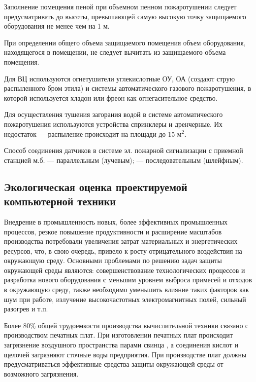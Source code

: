 Заполнение помещения пеной при объемном пенном пожаротушении следует предусматривать до высоты, превышающей самую высокую
точку защищаемого оборудования не менее чем на 1 м.

При определении общего объема защищаемого помещения объем оборудования, находящегося в помещении, не следует вычитать
из защищаемого объема помещения.


Для ВЦ используются огнетушители углекислотные ОУ, ОА (создают струю распыленного бром этила) и системы автоматического
газового пожаротушения, в которой используется хладон или фреон как огнегасительное средство.

Для осуществления тушения загорания водой в системе автоматического пожаротушения используются устройства спринклеры и дренчерные.
Их недостаток — распыление происходит на площади до 15 м$^2$.

Способ соединения датчиков в системе эл. пожарной сигнализации с приемной станцией м.б. — параллельным (лучевым);
— последовательным (шлейфным).

\subsection{Экологическая оценка проектируемой компьютерной техники}
Внедрение в промышленность новых, более эффективных промышленных процессов, резкое повышение продуктивности и расширение
масштабов производства потребовали увеличения затрат материальных и энергетических ресурсов, что, в свою очередь,
привело к росту отрицательного воздействия на окружающую среду. Основными проблемами по решению задач защиты окружающей
среды являются: совершенствование технологических процессов и разработка нового оборудования с меньшим уровнем выброса
примесей и отходов в окружающую среду, также необходимо уменьшить влияние таких факторов как шум при работе, излучение
высокочастотных электромагнитных полей, сильный разогрев и т.п.

Более 80\% общей трудоемкости производства вычислительной техники связано с производством печатных плат.
При изготовлении печатных плат происходит загрязнение воздушного пространства парами свинца \cite{bjd43}, а соединения кислот и
щелочей загрязняют сточные воды предприятия. При производстве плат должны предусматриваться эффективные средства
защиты окружающей среды от возможного загрязнения.

